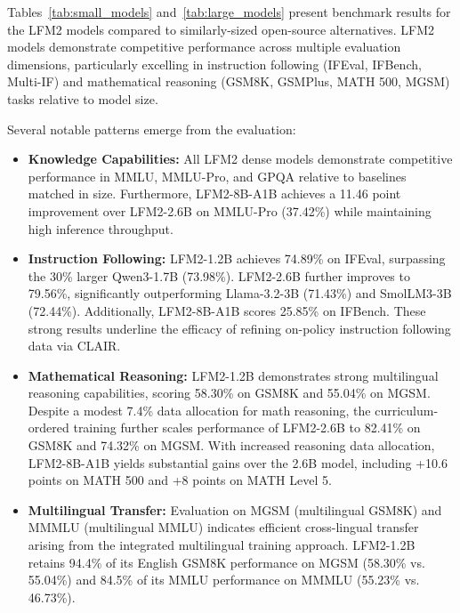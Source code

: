 \documentclass{article}
\begin{document}
Tables~\ref{tab:small_models} and~\ref{tab:large_models} present benchmark results for the LFM2 models compared to similarly-sized open-source alternatives. LFM2 models demonstrate competitive performance across multiple evaluation dimensions, particularly excelling in instruction following (IFEval, IFBench, Multi-IF) and mathematical reasoning (GSM8K, GSMPlus, MATH 500, MGSM) tasks relative to model size.

Several notable patterns emerge from the evaluation:

\begin{itemize}
\item \textbf{Knowledge Capabilities:} All LFM2 dense models demonstrate competitive performance in MMLU, MMLU-Pro, and GPQA relative to baselines matched in size. Furthermore, LFM2-8B-A1B achieves a 11.46 point improvement over LFM2-2.6B on MMLU-Pro (37.42\%) while maintaining high inference throughput.

\item \textbf{Instruction Following:} LFM2-1.2B achieves 74.89\% on IFEval, surpassing the 30\% larger Qwen3-1.7B (73.98\%). LFM2-2.6B further improves to 79.56\%, significantly outperforming Llama-3.2-3B (71.43\%) and SmolLM3-3B (72.44\%). Additionally, LFM2-8B-A1B scores 25.85\% on IFBench. These strong results underline the efficacy of refining on-policy instruction following data via CLAIR.

\item \textbf{Mathematical Reasoning:} LFM2-1.2B demonstrates strong multilingual reasoning capabilities, scoring 58.30\% on GSM8K and 55.04\% on MGSM. Despite a modest 7.4\% data allocation for math reasoning, the curriculum-ordered training further scales performance of LFM2-2.6B to 82.41\% on GSM8K and 74.32\% on MGSM. With increased reasoning data allocation, LFM2-8B-A1B yields substantial gains over the 2.6B model, including +10.6 points on MATH 500 and +8 points on MATH Level 5.

\item \textbf{Multilingual Transfer:} Evaluation on MGSM (multilingual GSM8K) and MMMLU (multilingual MMLU) indicates efficient cross-lingual transfer arising from the integrated multilingual training approach. LFM2-1.2B retains 94.4\% of its English GSM8K performance on MGSM (58.30\% vs. 55.04\%) and 84.5\% of its MMLU performance on MMMLU (55.23\% vs. 46.73\%).
\end{itemize}
\end{document}

